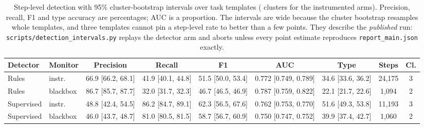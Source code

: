 \begin{table}[!ht]
\centering\scriptsize
\setlength{\tabcolsep}{4pt}
\caption{Step-level detection with 95\% cluster-bootstrap intervals over task templates (\DetectionClusters{} clusters for the instrumented arms). Precision, recall, F1 and type accuracy are percentages; AUC is a proportion. The intervals are wide because the cluster bootstrap resamples whole templates, and three templates cannot pin a step-level rate to better than a few points. They describe the \emph{published} run: \texttt{scripts/detection\_intervals.py} replays the detector arm and aborts unless every point estimate reproduces \texttt{report\_main.json} exactly.}
\label{tab:detection_ci}
\begin{adjustbox}{max width=\textwidth}
\begin{tabular}{@{}llccccccc@{}}
\toprule
Detector & Monitor & Precision & Recall & F1 & AUC & Type & Steps & Cl. \\
\midrule
Rules & instr. & 66.9 [66.2, 68.1] & 41.9 [40.1, 44.8] & 51.5 [50.0, 53.4] & 0.772 [0.749, 0.789] & 34.6 [33.6, 36.2] & 24,175 & 3 \\
Rules & blackbox & 86.7 [85.7, 87.7] & 32.0 [31.7, 32.3] & 46.7 [46.5, 46.9] & 0.787 [0.759, 0.822] & 22.1 [21.7, 22.6] & 1,094 & 2 \\
Supervised & instr. & 48.8 [42.4, 54.5] & 86.2 [84.7, 89.1] & 62.3 [56.5, 67.6] & 0.762 [0.753, 0.770] & 51.6 [49.3, 53.8] & 11,193 & 3 \\
Supervised & blackbox & 46.0 [43.7, 48.7] & 81.0 [80.5, 81.5] & 58.7 [56.7, 60.9] & 0.750 [0.747, 0.752] & 39.9 [37.4, 42.7] & 1,060 & 2 \\
\bottomrule
\end{tabular}
\end{adjustbox}
\end{table}
